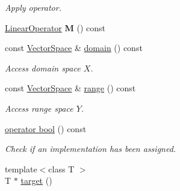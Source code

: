 \begin{DoxyCompactItemize}
\begin{DoxyCompactList}\small\item\em Apply operator. \end{DoxyCompactList}\item 
\hypertarget{classSpacy_1_1DynamicOperator_a38c8c5337fd79a98a7e64139d0cbed38}{}\hyperlink{classSpacy_1_1LinearOperator}{Linear\+Operator} {\bfseries M} () const \label{classSpacy_1_1DynamicOperator_a38c8c5337fd79a98a7e64139d0cbed38}

\item 
\hypertarget{classSpacy_1_1DynamicOperator_ad457cb5571c721f97530895aa26af626}{}const \hyperlink{classSpacy_1_1VectorSpace}{Vector\+Space} \& \hyperlink{classSpacy_1_1DynamicOperator_ad457cb5571c721f97530895aa26af626}{domain} () const \label{classSpacy_1_1DynamicOperator_ad457cb5571c721f97530895aa26af626}

\begin{DoxyCompactList}\small\item\em Access domain space $X$. \end{DoxyCompactList}\item 
\hypertarget{classSpacy_1_1DynamicOperator_ab760994d921fa8d9df2882f9e4cfc9c3}{}const \hyperlink{classSpacy_1_1VectorSpace}{Vector\+Space} \& \hyperlink{classSpacy_1_1DynamicOperator_ab760994d921fa8d9df2882f9e4cfc9c3}{range} () const \label{classSpacy_1_1DynamicOperator_ab760994d921fa8d9df2882f9e4cfc9c3}

\begin{DoxyCompactList}\small\item\em Access range space $Y$. \end{DoxyCompactList}\item 
\hypertarget{classSpacy_1_1DynamicOperator_a68e9c377337457ace5b3755e448e23b5}{}\hyperlink{classSpacy_1_1DynamicOperator_a68e9c377337457ace5b3755e448e23b5}{operator bool} () const \label{classSpacy_1_1DynamicOperator_a68e9c377337457ace5b3755e448e23b5}

\begin{DoxyCompactList}\small\item\em Check if an implementation has been assigned. \end{DoxyCompactList}\item 
\hypertarget{structSpacy_1_1Mixin_1_1ToTarget_a3510786172c63a074eda127276d13392}{}{\footnotesize template$<$class T $>$ }\\T $\ast$ \hyperlink{structSpacy_1_1Mixin_1_1ToTarget_a3510786172c63a074eda127276d13392}{target} ()\label{structSpacy_1_1Mixin_1_1ToTarget_a3510786172c63a074eda127276d13392}


\end{DoxyCompactItemize}
